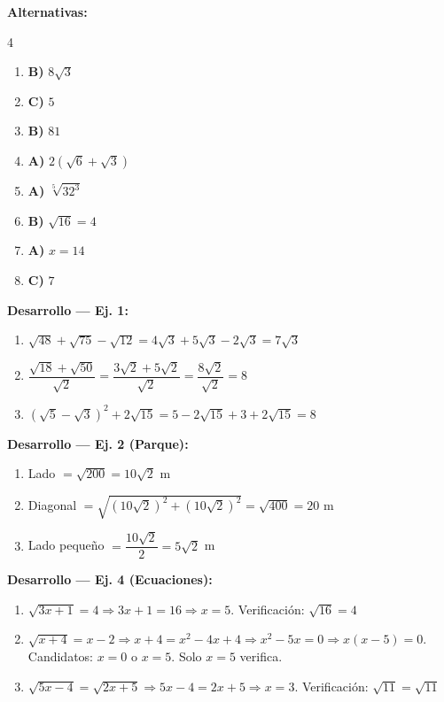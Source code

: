 \documentclass[11pt, letterpaper]{article}
\begin{document}
\begin{tcolorbox}[answerbox, title={Respuestas de algunos ejercicios finales}]
\textbf{Alternativas:}
\begin{multicols}{4}
\begin{enumerate}[label=\textbf{\arabic*.}]
  \item \textbf{B)} $8\sqrt{3}$
  \item \textbf{C)} $5$
  \item \textbf{B)} $81$
  \item \textbf{A)} $2(\sqrt{6}+\sqrt{3})$
  \item \textbf{A)} $\sqrt[5]{32^3}$
  \item \textbf{B)} $\sqrt{16}=4$
  \item \textbf{A)} $x=14$
  \item \textbf{C)} $7$
\end{enumerate}
\end{multicols}

\medskip
\textbf{Desarrollo — Ej. 1:}
\begin{enumerate}[label=\alph*)]
  \item $\sqrt{48}+\sqrt{75}-\sqrt{12} = 4\sqrt{3}+5\sqrt{3}-2\sqrt{3} = 7\sqrt{3}$
  \item $\dfrac{\sqrt{18}+\sqrt{50}}{\sqrt{2}} = \dfrac{3\sqrt{2}+5\sqrt{2}}{\sqrt{2}} = \dfrac{8\sqrt{2}}{\sqrt{2}} = 8$
  \item $(\sqrt{5}-\sqrt{3})^2+2\sqrt{15} = 5-2\sqrt{15}+3+2\sqrt{15} = 8$
\end{enumerate}

\medskip
\textbf{Desarrollo — Ej. 2 (Parque):}
\begin{enumerate}[label=\alph*)]
  \item Lado $= \sqrt{200} = 10\sqrt{2}$ m
  \item Diagonal $= \sqrt{(10\sqrt{2})^2+(10\sqrt{2})^2} = \sqrt{400}=20$ m
  \item Lado pequeño $= \dfrac{10\sqrt{2}}{2} = 5\sqrt{2}$ m
\end{enumerate}

\medskip
\textbf{Desarrollo — Ej. 4 (Ecuaciones):}
\begin{enumerate}[label=\alph*)]
  \item $\sqrt{3x+1}=4 \Rightarrow 3x+1=16 \Rightarrow x=5$. Verificación: $\sqrt{16}=4$ \checkmark
  \item $\sqrt{x+4}=x-2 \Rightarrow x+4=x^2-4x+4 \Rightarrow x^2-5x=0 \Rightarrow x(x-5)=0$. Candidatos: $x=0$ o $x=5$. Solo $x=5$ verifica. \checkmark
  \item $\sqrt{5x-4}=\sqrt{2x+5} \Rightarrow 5x-4=2x+5 \Rightarrow x=3$. Verificación: $\sqrt{11}=\sqrt{11}$ \checkmark
\end{enumerate}


\end{tcolorbox}
\end{document}
